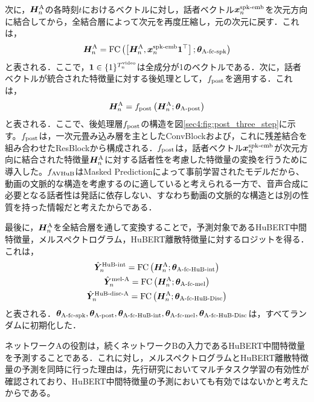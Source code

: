 次に，$\bm{H}^{\text{A}}_{n}$の各時刻$t$におけるベクトルに対し，話者ベクトル$\bm{x}^{\text{spk-emb}}_{n}$を次元方向に結合してから，全結合層によって次元を再度圧縮し，元の次元に戻す．これは，
\begin{equation}
    \bm{H}^{\text{A}}_{n} = \text{FC}\left(\left[\bm{H}^{\text{A}}_{n}, \bm{x}^{\text{spk-emb}}_{n} \bm{1}^{\top}\right]; \bm{\theta}_{\text{A-fc-spk}}\right)
\end{equation}
と表される．ここで，$\bm{1} \in \{1\}^{T^{\text{video}}_{n}}$は全成分が1のベクトルである．次に，話者ベクトルが統合された特徴量に対する後処理として，$f_{\text{post}}$を適用する．これは，
\begin{equation}
    \bm{H}^{\text{A}}_{n} = f_{\text{post}}\left(\bm{H}^{\text{A}}_{n}; \bm{\theta}_{\text{A-post}}\right)
\end{equation}
と表される．ここで、後処理層$f_{\text{post}}$の構造を図\ref{sec4:fig:post_three_step}に示す。$f_{\text{post}}$は，一次元畳み込み層を主としたConvBlockおよび，これに残差結合を組み合わせたResBlockから構成される．$f_{\text{post}}$は，話者ベクトル$\bm{x}^{\text{spk-emb}}_{n}$が次元方向に結合された特徴量$\bm{H}^{\text{A}}_{n}$に対する話者性を考慮した特徴量の変換を行うために導入した。$f_{\text{AVHuB}}$はMasked Predictionによって事前学習されたモデルだから、動画の文脈的な構造を考慮するのに適していると考えられる一方で、音声合成に必要となる話者性は発話に依存しない、すなわち動画の文脈的な構造とは別の性質を持った情報だと考えたからである．

最後に，$\bm{H}^{\text{A}}_{n}$を全結合層を通して変換することで，予測対象であるHuBERT中間特徴量，メルスペクトログラム，HuBERT離散特徴量に対するロジットを得る．これは，
\begin{gather}
    \hat{\bm{Y}}^{\text{HuB-int}}_{n} = \text{FC}\left(\bm{H}^{\text{A}}_{n}; \bm{\theta}_{\text{A-fc-HuB-int}}\right) \\
    \hat{\bm{Y}}^{\text{mel-A}}_{n} = \text{FC}\left(\bm{H}^{\text{A}}_{n}; \bm{\theta}_{\text{A-fc-mel}}\right) \\
    \hat{\bm{Y}}^{\text{HuB-disc-A}}_{n} = \text{FC}\left(\bm{H}^{\text{A}}_{n}; \bm{\theta}_{\text{A-fc-HuB-Disc}}\right)
\end{gather}
と表される．$\bm{\theta}_{\text{A-fc-spk}}, \bm{\theta}_{\text{A-post}}, \bm{\theta}_{\text{A-fc-HuB-int}}, \bm{\theta}_{\text{A-fc-mel}}, \bm{\theta}_{\text{A-fc-HuB-Disc}}$は，すべてランダムに初期化した．

ネットワークAの役割は，続くネットワークBの入力であるHuBERT中間特徴量を予測することである．これに対し，メルスペクトログラムとHuBERT離散特徴量の予測を同時に行った理由は，先行研究\cite{kim2023lip_multitask,choi2023intelligible}においてマルチタスク学習の有効性が確認されており、HuBERT中間特徴量の予測においても有効ではないかと考えたからである。

